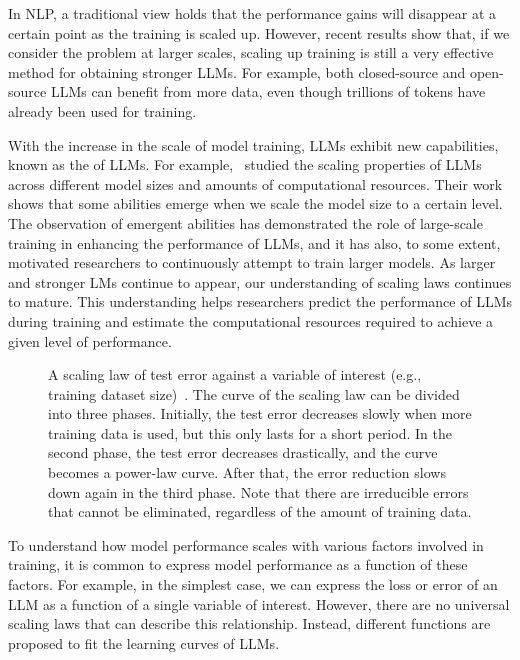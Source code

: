 In NLP, a traditional view holds that the performance gains will disappear at a certain point as the training is scaled up. However, recent results show that, if we consider the problem at larger scales, scaling up training is still a very effective method for obtaining stronger LLMs. For example, both closed-source and open-source LLMs can benefit from more data, even though trillions of tokens have already been used for training.

With the increase in the scale of model training, LLMs exhibit new capabilities, known as the  of LLMs. For example,~\citet{wei-etal:2022emergent} studied the scaling properties of LLMs across different model sizes and amounts of computational resources. Their work shows that some abilities emerge when we scale the model size to a certain level. The observation of emergent abilities has demonstrated the role of large-scale training in enhancing the performance of LLMs, and it has also, to some extent, motivated researchers to continuously attempt to train larger models. As larger and stronger LMs continue to appear, our understanding of scaling laws continues to mature. This understanding helps researchers predict the performance of LLMs during training and estimate the computational resources required to achieve a given level of performance.

\begin{figure}[!t]
\centering

\caption{A scaling law of test error against a variable of interest (e.g., training dataset size)~\cite{hestness-etal:2017deep}. The curve of the scaling law can be divided into three phases. Initially, the test error decreases slowly when more training data is used, but this only lasts for a short period. In the second phase, the test error decreases drastically, and the curve becomes a power-law curve. After that, the error reduction slows down again in the third phase. Note that there are irreducible errors that cannot be eliminated, regardless of the amount of training data.}
\label{fig:scaling-power-law-curve}
\end{figure}

To understand how model performance scales with various factors involved in training, it is common to express model performance as a function of these factors. For example, in the simplest case, we can express the loss or error of an LLM as a function of a single variable of interest. However, there are no universal scaling laws that can describe this relationship. Instead, different functions are proposed to fit the learning curves of LLMs.


